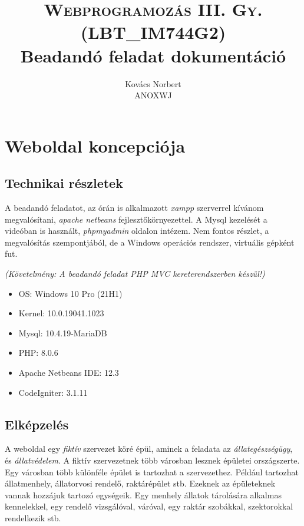 \documentclass[a4paper,12pt]{article}
\begin{document}
\title{\textsc{Webprogramozás III. Gy. \\ {\normalsize (LBT\_IM744G2)}} \\ {\normalsize Beadandó feladat dokumentáció}}
\author{Kovács Norbert \\ ANOXWJ}
\maketitle
\newpage
\tableofcontents
\newpage


\section{Weboldal koncepciója}
\subsection{Technikai részletek}
A beadandó feladatot, az órán is alkalmazott \textit{xampp} szerverrel kívánom megvalósítani, \textit{apache netbeans} fejlesztőkörnyezettel. A Mysql kezelését a videóban is használt, \textit{phpmyadmin} oldalon intézem. Nem fontos részlet, a megvalósítás szempontjából, de a Windows operációs rendszer, virtuális gépként fut.

\begin{center}
	\textit{{\footnotesize (Követelmény: A beadandó feladat PHP MVC kereterendszerben készül!)}}
\end{center}

\begin{itemize}
	\item OS: Windows 10 Pro (21H1)
	\item Kernel: 10.0.19041.1023
	\item Mysql: 10.4.19-MariaDB
	\item PHP: 8.0.6
	\item Apache Netbeans IDE: 12.3
	\item CodeIgniter: 3.1.11
\end{itemize}

\subsection{Elképzelés}
A weboldal egy \textit{fiktív} szervezet köré épül, aminek a feladata  az \textit{állategészségügy}, és \textit{állatvédelem}. A fiktív szervezetnek több városban lesznek épületei országszerte. Egy városban több különféle épület is tartozhat a szervezethez. Például tartozhat állatmenhely, állatorvosi rendelő, raktárépület stb. Ezeknek az épületeknek vannak hozzájuk tartozó egységeik. Egy menhely állatok tárolására alkalmas kennelekkel, egy rendelő vizsgálóval, váróval, egy raktár szobákkal, szektorokkal rendelkezik stb.
\end{document}
